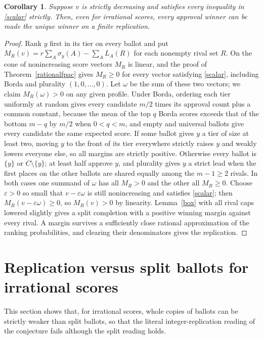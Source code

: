 \documentclass[11pt,a4paper]{article}
\newtheorem{corollary}[theorem]{Corollary}
\theoremstyle{definition}
\theoremstyle{remark}
\begin{document}
\begin{corollary}\label{interior}
Suppose $v$ is strictly decreasing and satisfies every inequality in \eqref{scalar} strictly. Then, even for irrational scores, every approval winner can be made the unique winner on a finite replication.
\end{corollary}
\begin{proof}
Rank $y$ first in its tier on every ballot and put $M_R(v)=r\sum_A\sigma_y(A)-\sum_AL_A(R)$ for each nonempty rival set $R$. On the cone of nonincreasing score vectors $M_R$ is linear, and the proof of Theorem~\ref{rationalfpac} gives $M_R\ge0$ for every vector satisfying \eqref{scalar}, including Borda and plurality $(1,0,\ldots,0)$. Let $\omega$ be the sum of these two vectors; we claim $M_R(\omega)>0$ on any given profile. Under Borda, ordering each tier uniformly at random gives every candidate $m/2$ times its approval count plus a common constant, because the mean of the top $q$ Borda scores exceeds that of the bottom $m-q$ by $m/2$ when $0<q<m$, and empty and universal ballots give every candidate the same expected score. If some ballot gives $y$ a tier of size at least two, moving $y$ to the front of its tier everywhere strictly raises $y$ and weakly lowers everyone else, so all margins are strictly positive. Otherwise every ballot is $\{y\}$ or $C\setminus\{y\}$; at least half approve $y$, and plurality gives $y$ a strict lead when the first places on the other ballots are shared equally among the $m-1\ge2$ rivals. In both cases one summand of $\omega$ has all $M_R>0$ and the other all $M_R\ge0$. Choose $\varepsilon>0$ so small that $v-\varepsilon\omega$ is still nonincreasing and satisfies \eqref{scalar}; then $M_R(v-\varepsilon\omega)\ge0$, so $M_R(v)>0$ by linearity. Lemma~\ref{box} with all rival caps lowered slightly gives a split completion with a positive winning margin against every rival. A margin survives a sufficiently close rational approximation of the ranking probabilities, and clearing their denominators gives the replication.
\end{proof}

\section{Replication versus split ballots for irrational scores}\label{sec:arithmetic}
This section shows that, for irrational scores, whole copies of ballots can be strictly weaker than split ballots, so that the literal integer-replication reading of the conjecture fails although the split reading holds.
\end{document}
